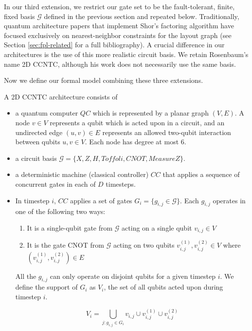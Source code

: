 In our third extension, we restrict our gate set to be the
fault-tolerant, finite, fixed basis $\mathcal{G}$ defined
in the previous section and repeated below.
Traditionally, quantum architecture papers that
implement Shor's factoring algorithm have focused exclusively on
nearest-neighbor constraints for the layout graph (see Section \ref{sec:fpl-related} for a full
bibliography). A crucial difference in our architectures is
the use of this more realistic circuit basis.
We retain Rosenbaum's name \textsf{2D CCNTC}, although
his work does not necessarily use the same basis.

Now we define our formal model combining these three
extensions.

\begin{definition}
A \textsf{2D CCNTC} architecture consists of

\begin{itemize}
\item a quantum computer $QC$ which is represented by a planar graph $(V,E)$. A
node $v \in V$ represents a qubit which is acted upon in a circuit, and an
undirected edge $(u,v) \in E$ represents 
an allowed two-qubit interaction between qubits $u,v \in V$. Each node has
degree at most $6$.
\item a circuit basis $\mathcal{G} = \{X, Z, H, Toffoli, CNOT, MeasureZ\}$.

\item a deterministic machine (classical controller) $CC$ that applies a sequence
of concurrent gates in each of $D$ timesteps.
\item In timestep $i$, $CC$ applies a set of
gates $G_i = \{g_{i,j} \in \mathcal{G} \}$.
Each $g_{i,j}$ operates in one of the following two ways:
\begin{enumerate}
\item It is a single-qubit gate from $\mathcal{G}$ acting on a single qubit $v_{i,j} \in V$
\item
It is the gate CNOT from $\mathcal{G}$ acting on two qubits $v^{(1)}_{i,j}, v^{(2)}_{i,j} \in V$ where
$\left(v^{(1)}_{i,j}, v^{(2)}_{i,j}\right) \in E$
\end{enumerate}
All the $g_{i,j}$ can only operate on
disjoint qubits for a given timestep $i$. We define the support of $G_i$
as $V_i$, the set of all qubits acted upon during timestep $i$.

\begin{equation}
V_i = \bigcup_{j: g_{i,j} \in G_i} v_{i,j} \cup v^{(1)}_{i,j} \cup v^{(2)}_{i,j}
\end{equation}

\end{itemize}
\end{definition}

